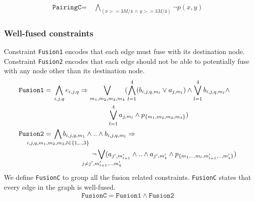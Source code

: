 \begin{align*}
 \texttt{PairingC} =\;& \bigwedge\limits_{(x >= 3M/4 \, \land \, y >= 3M/4)} \neg p(x,y)
\end{align*}

\subsubsection{Well-fused constraints}
Constraint \texttt{Fusion1} encodes that each edge must fuse with
its destination node.
%
Constraint \texttt{Fusion2} encodes that each edge should not
be able to potentially fuse with any node other than its destination node.
\begin{align*}
\texttt{Fusion1} =\;&
\bigwedge\limits_{i,j,q} e_{i,j,q} \limplies
\bigvee_{{m_1,m_2,m_3,m_4}} (\Land_{l=1}^4 ( b_{i,j,q,m_l} \lor a_{j,m_l} ) \land 
\Lor\limits_{l=1}^4 b_{i,j,q,m_l} \land\\
& \qquad \qquad \qquad \qquad \Lor\limits_{l=1}^4 a_{j,m_l}\land p_{\{m_1,m_2,m_3,m_4\}})
\\
\texttt{Fusion2} =\;&
\bigwedge\limits_{\mathclap{i,j,q,m_1,m_2,m_3, l \in \{1,..,3\}}} b_{i,j,q,m_1} \land ..\land b_{i,j,q,m_l} \limplies \\
& \hspace{2cm} \neg 
\bigvee_{\mathclap{j \neq j^{\prime}, m_{l+1}^{\prime},..,m_{4}^{\prime}}} ( a_{j^{\prime},m_{l+1}^{\prime}} \land .. \land a_{j^{\prime},m_4^{\prime}} \land p_{\{m_1,..,m_l,m^{\prime}_{l+1},..,m^{\prime}_4\}})
\\
\end{align*}
We define \texttt{FusionC} to group all the fusion related constraints.
% 
\texttt{FusionC} states that every edge in the graph is well-fused.
\begin{align*}
\texttt{FusionC} = \texttt{Fusion1} \land \texttt{Fusion2} 
\end{align*}

